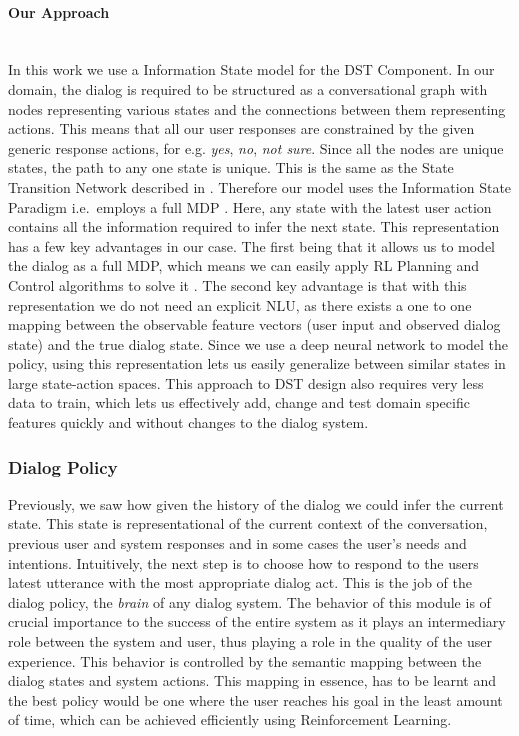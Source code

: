 \documentclass[12pt]{extarticle}
\newcommand{\myparagraph}[1]{\paragraph{#1}\mbox{}\\ \linebreak}
\numberwithin{equation}{section}
\begin{document}
	\myparagraph{Our Approach}	
	In this work we use a Information State model for the DST Component. In our domain,  the dialog is required to be structured as a conversational graph with nodes representing various states and the connections between them representing actions. This means that all our user responses are constrained by the given generic response actions,  for e.g. \textit{yes}, \textit{no}, \textit{not sure}. Since all the nodes are unique states, the path to any one state is unique. This is the same as the State Transition Network described in \cite{Sutton-introRL}. Therefore our model uses the Information State Paradigm i.e.\ employs a full MDP \cite{Larsson:2000:ISD:973935.973943}. Here, any state with the latest user action contains all the information required to infer the next state. This representation has a few key advantages in our case. The first being that it allows us to model the dialog as a full MDP, which means we can easily apply RL Planning and Control algorithms to solve it \cite{Sutton-introRL}.  The second key advantage is that with this representation we do not need an explicit NLU, as there exists a one to one mapping between the observable feature vectors (user input and observed dialog state) and the true dialog state. Since we use a deep neural network to model the policy, using this representation lets us easily generalize between similar states in large state-action spaces. This approach to DST design also requires very less data to train, which lets us effectively add, change and test domain specific features quickly and without changes to the dialog system.
	\subsubsection{Dialog Policy} 
	Previously, we saw how given the history of the dialog we could infer the current state. This state is representational of the current context of the conversation, previous user and system responses and in some cases the user's needs and intentions. Intuitively, the next step is to choose how to respond to the users latest utterance with the most appropriate dialog act. This is the job of the dialog policy, the \textit{brain} of any dialog system. The behavior of this module is of crucial importance to the success of the entire system as it plays an intermediary role between the system and user, thus playing a role in the quality of the user experience. This behavior is controlled by the semantic mapping between the dialog states and system actions. This mapping in essence, has to be learnt and the best policy would be one where the user reaches his goal in the least amount of time, which can be achieved efficiently using Reinforcement Learning. 
	
\end{document}
